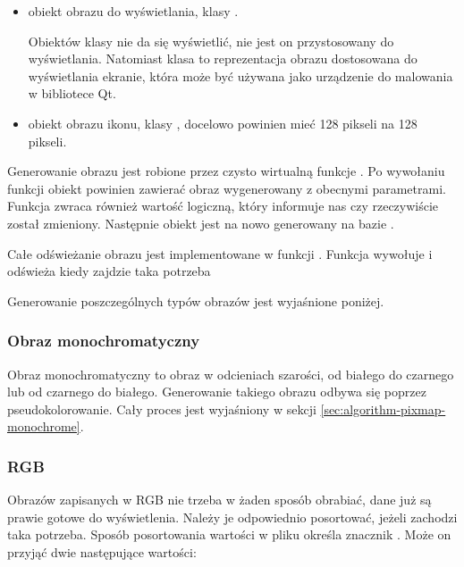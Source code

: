 \begin{itemize}
    \item {} obiekt obrazu do wyświetlania, klasy .

          Obiektów klasy  nie da się wyświetlić, nie jest on przystosowany do wyświetlania.
          Natomiast klasa  to reprezentacja obrazu dostosowana do wyświetlania ekranie, która może być używana jako urządzenie do malowania w bibliotece Qt.

    \item {} obiekt obrazu ikonu, klasy , docelowo powinien mieć 128 pikseli na 128 pikseli.

\end{itemize}

Generowanie obrazu jest robione przez czysto wirtualną funkcje .
Po wywołaniu funkcji obiekt  powinien zawierać obraz wygenerowany z obecnymi parametrami.
Funkcja zwraca również wartość logiczną, który informuje nas czy  rzeczywiście został zmieniony.
Następnie obiekt  jest na nowo generowany na bazie .

Całe odświeżanie obrazu jest implementowane w funkcji .
Funkcja wywołuje  i odświeża  kiedy zajdzie taka potrzeba

Generowanie poszczególnych typów obrazów jest wyjaśnione poniżej.


\subsubsection{Obraz monochromatyczny}
\par
Obraz monochromatyczny to obraz w odcieniach szarości, od białego do czarnego lub od czarnego do białego.
Generowanie takiego obrazu odbywa się poprzez pseudokolorowanie.
Cały proces jest wyjaśniony w sekcji \ref{sec:algorithm-pixmap-monochrome}.

\subsubsection{RGB}
Obrazów zapisanych w RGB nie trzeba w żaden sposób obrabiać, dane już są prawie gotowe do wyświetlenia.
Należy je odpowiednio posortować, jeżeli zachodzi taka potrzeba.
Sposób posortowania wartości w pliku określa znacznik .
Może on przyjąć dwie następujące wartości:

